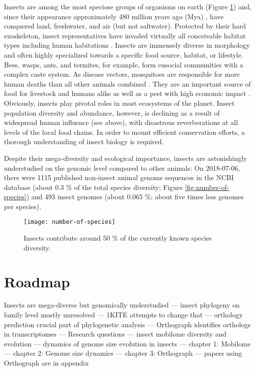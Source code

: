 Insects are among the most speciose groups of organisms on earth (Figure
\ref{fig:biodiversity}) and, since their appearance approximately 480
million years ago (Mya) \citep{Misof2014}, have conquered land,
freshwater, and air (but not saltwater). Protected by their hard
exoskeleton, insect representatives have invaded virtually all
conceivable habitat types including human habitations
\citep{Bertone2016}. Insects are immensely diverse in morphology
\citep{Grimaldi2005} and often highly specialized towards a specific
food source, habitat, or lifestyle. Bees, wasps, ants, and termites, for
example, form eusocial communities with a complex caste system. As
disease vectors, mosquitoes are responsible for more human deaths than
all other animals combined \citep{WHO2017, Linnell2011, Lamarque2009,
DeMaddalena2008, Kasturiratne2008, Packer2005}. They are an important
source of food for livestock and humans alike as well as a pest with
high economic impact \citep{Oliveira2014}. Obviously, insects play
pivotal roles in most ecosystems of the planet. Insect population
diversity and abundance, however, is declining \citep{Vogel2017} as a
result of widespread human influence (see above), with disastrous
reverberations at all levels of the local food chains. In order to mount
efficient conservation efforts, a thorough understanding of insect
biology is required.

Despite their mega-diversity and ecological importance, insects are
astonishingly understudied on the genomic level compared to other
animals: On 2018-07-06, there were 1115 published non-insect animal
genome sequences in the NCBI database (about 0.3 \% of the total species
diversity; Figure \ref{fig:number-of-species}) and 493 insect genomes
(about 0.065 \%; about five times less genomes per species).

\begin{figure}
\centering
\texttt{[image: number-of-species]}
\caption{Insects contribute around 50 \% of the currently known species
diversity.}
\label{fig:biodiversity}
\end{figure}

\section{Roadmap}

Insects are mega-diverse but genomically understudied --- insect
phylogeny on family level mostly unresolved --- 1KITE attempts to change
that --- orthology prediction crucial part of phylogenetic analysis ---
Orthograph identifies orthologs in transcriptomes --- Research questions
--- insect mobilome diversity and evolution --- dynamics of genome size
evolution in insects --- chapter 1: Mobilome --- chapter 2: Genome size
dynamics --- chapter 3: Orthograph --- papers using Orthograph are in
appendix
